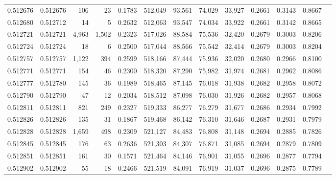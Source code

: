 \begin{tabular}{rrrrrrrrrrrrr}
0.512676 & 0.512676 &   106 &    23 &                                     0.1783 & 512,049 &  93,561 &  74,029 &  33,927 & 0.2661 & 0.3143 & 0.8667 \\
0.512680 & 0.512712 &    14 &     5 &                                     0.2632 & 512,063 &  93,547 &  74,034 &  33,922 & 0.2661 & 0.3142 & 0.8665 \\
0.512721 & 0.512721 & 4,963 & 1,502 &                                     0.2323 & 517,026 &  88,584 &  75,536 &  32,420 & 0.2679 & 0.3003 & 0.8206 \\
0.512724 & 0.512724 &    18 &     6 &                                     0.2500 & 517,044 &  88,566 &  75,542 &  32,414 & 0.2679 & 0.3003 & 0.8204 \\
0.512757 & 0.512757 & 1,122 &   394 &                                     0.2599 & 518,166 &  87,444 &  75,936 &  32,020 & 0.2680 & 0.2966 & 0.8100 \\
0.512771 & 0.512771 &   154 &    46 &                                     0.2300 & 518,320 &  87,290 &  75,982 &  31,974 & 0.2681 & 0.2962 & 0.8086 \\
0.512777 & 0.512780 &   145 &    36 &                                     0.1989 & 518,465 &  87,145 &  76,018 &  31,938 & 0.2682 & 0.2958 & 0.8072 \\
0.512790 & 0.512790 &    47 &    12 &                                     0.2034 & 518,512 &  87,098 &  76,030 &  31,926 & 0.2682 & 0.2957 & 0.8068 \\
0.512811 & 0.512811 &   821 &   249 &                                     0.2327 & 519,333 &  86,277 &  76,279 &  31,677 & 0.2686 & 0.2934 & 0.7992 \\
0.512826 & 0.512826 &   135 &    31 &                                     0.1867 & 519,468 &  86,142 &  76,310 &  31,646 & 0.2687 & 0.2931 & 0.7979 \\
0.512828 & 0.512828 & 1,659 &   498 &                                     0.2309 & 521,127 &  84,483 &  76,808 &  31,148 & 0.2694 & 0.2885 & 0.7826 \\
0.512845 & 0.512845 &   176 &    63 &                                     0.2636 & 521,303 &  84,307 &  76,871 &  31,085 & 0.2694 & 0.2879 & 0.7809 \\
0.512851 & 0.512851 &   161 &    30 &                                     0.1571 & 521,464 &  84,146 &  76,901 &  31,055 & 0.2696 & 0.2877 & 0.7794 \\
0.512902 & 0.512902 &    55 &    18 &                                     0.2466 & 521,519 &  84,091 &  76,919 &  31,037 & 0.2696 & 0.2875 & 0.7789 \\

\end{tabular}
